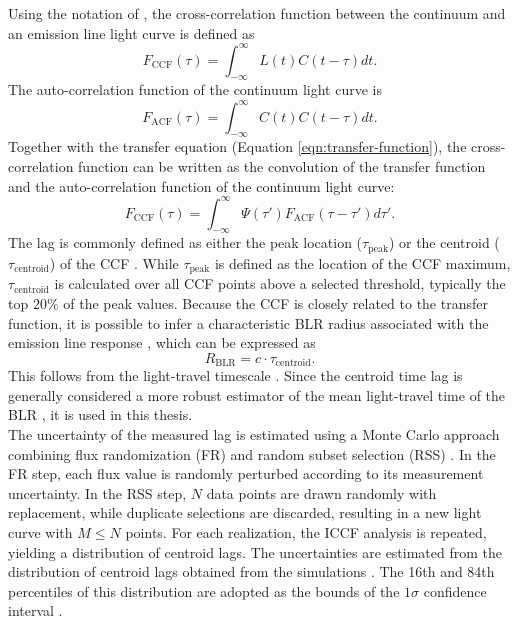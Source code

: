 Using the notation of \cite{peterson1997introduction}, the cross-correlation function between the continuum and an emission line light curve is defined as \begin{equation}
	F_\mathrm{CCF}(\tau) = \int_{-\infty}^{\infty}L(t)C(t-\tau)dt.
\end{equation}
The auto-correlation function of the continuum  light curve is \begin{equation}
	F_\mathrm{ACF}(\tau) = \int_{-\infty}^{\infty}C(t)C(t-\tau)dt.
\end{equation}
Together with the transfer equation (Equation \ref{eqn:transfer-function}), the cross-correlation function can be written as the convolution of the transfer function and the auto-correlation function of the continuum light curve:
\begin{equation}
	F_\mathrm{CCF}(\tau) = \int_{-\infty}^{\infty}\Psi(\tau') F_\mathrm{ACF}(\tau-\tau')d\tau'.
\end{equation}
The lag is commonly defined as either the peak location ($\tau_{\mathrm{peak}}$) or the centroid ($\tau_{\mathrm{centroid}}$) of the CCF \parencite{peterson1997introduction}. 
While $\tau_{\mathrm{peak}}$ is defined as the location of the CCF maximum, $\tau_{\mathrm{centroid}}$ is calculated over all CCF points above a selected threshold, typically the top $20\%$ of the peak values. Because the CCF is closely related to the transfer function, it is possible to infer a characteristic BLR radius associated with the emission line response \parencite{peterson1997introduction}, which can be expressed as \begin{equation}
	\label{eqn:charc_radius}
	R_\mathrm{BLR} = c \cdot \tau_{\mathrm{centroid}}.
\end{equation}
This follows from the light-travel timescale \parencite{peterson2004}. Since the centroid time lag is generally considered a more robust estimator of the mean light-travel time of the BLR \parencite{peterson2004}, it is used in this thesis.\\
The uncertainty of the measured lag is estimated using a Monte Carlo approach combining flux randomization (FR) and random subset selection (RSS) \parencite{Peterson_1998b, peterson2004}. In the FR step, each flux value is randomly perturbed according to its measurement uncertainty. In the RSS step, $N$ data points are drawn randomly with replacement, while duplicate selections are discarded, resulting in a new light curve with $M \leq N$ points. For each realization, the ICCF analysis is repeated, yielding a distribution of centroid lags. The uncertainties are estimated from the distribution of centroid lags obtained from the simulations \parencite{peterson2004}. The 16th and 84th percentiles of this distribution are adopted as the bounds of the $1\sigma$ confidence interval \parencite{Peterson_1998b}.


